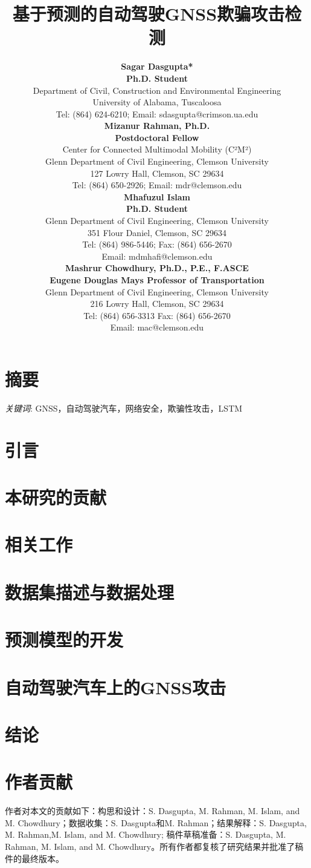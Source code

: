 \documentclass{trbunofficial}
\title{基于预测的自动驾驶GNSS欺骗攻击检测}
\author{%
  \textbf{Sagar Dasgupta*}\\
  \textbf{Ph.D. Student}\\
  Department of Civil, Construction and Environmental Engineering\\
  University of Alabama, Tuscaloosa\\
  Tel: (864) 624-6210; Email: sdasgupta@crimson.ua.edu\\

  \hfill\break%
  \textbf{Mizanur Rahman, Ph.D.}\\
  \textbf{Postdoctoral Fellow}\\
  Center for Connected Multimodal Mobility (C²M²)\\
  Glenn Department of Civil Engineering, Clemson University\\
  127 Lowry Hall, Clemson, SC 29634\\
  Tel: (864) 650-2926; Email: mdr@clemson.edu\\
  
  \hfill\break%
  \textbf{Mhafuzul Islam}\\
  \textbf{Ph.D. Student}\\
  Glenn Department of Civil Engineering, Clemson University\\
  351 Flour Daniel, Clemson, SC 29634\\
  Tel: (864) 986-5446; Fax: (864) 656-2670\\
  Email: mdmhafi@clemson.edu\\

  \hfill\break
  \textbf{Mashrur Chowdhury, Ph.D., P.E., F.ASCE}\\
  \textbf{Eugene Douglas Mays Professor of Transportation}\\
  Glenn Department of Civil Engineering, Clemson University\\
  216 Lowry Hall, Clemson, SC 29634\\
  Tel: (864) 656-3313 Fax: (864) 656-2670\\
  Email: mac@clemson.edu
}
\begin{document}
\maketitle

\section{摘要}



\hfill\break%
\noindent\textit{关键词}: GNSS，自动驾驶汽车，网络安全，欺骗性攻击，LSTM
\newpage

\section{引言}



\section{本研究的贡献}



\section{相关工作}


\section{数据集描述与数据处理}


\section{预测模型的开发}


\section{自动驾驶汽车上的GNSS攻击}


\section{结论}


\section{作者贡献}
作者对本文的贡献如下：构思和设计：S. Dasgupta, M. Rahman, M. Islam, and M. Chowdhury；数据收集：S. Dasgupta和M. Rahman；结果解释：S. Dasgupta, M. Rahman,M. Islam, and M. Chowdhury; 稿件草稿准备：S. Dasgupta, M. Rahman, M. Islam, and M. Chowdhury。所有作者都复核了研究结果并批准了稿件的最终版本。

\newpage



\end{document}
